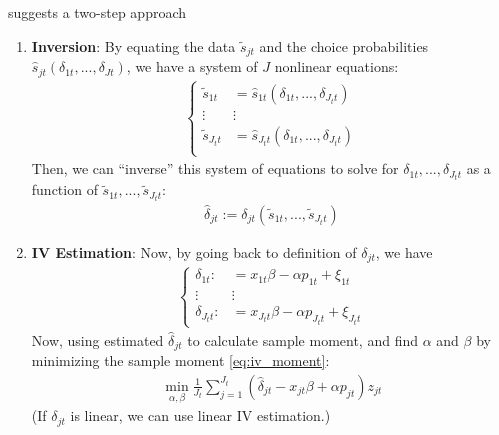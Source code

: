 \documentclass[11pt]{elegantbook}
\begin{document}
\begin{definition}
    \cite{berry1994estimating} suggests a two-step approach
    \begin{enumerate}
        \item \textbf{Inversion}: By equating the data $\tilde{s}_{jt}$ and the choice probabilities $\hat{s}_{jt}(\delta_{1t},...,\delta_{Jt})$, we have a system of $J$ nonlinear equations:
        \begin{equation}
            \begin{aligned}
                \left\{\begin{matrix}
                    \tilde{s}_{1t}&=\hat{s}_{1t}(\delta_{1t},...,\delta_{J_tt})\\
                    \vdots&\vdots\\
                    \tilde{s}_{J_tt}&=\hat{s}_{J_tt}(\delta_{1t},...,\delta_{J_tt})\\
                \end{matrix}\right.
            \end{aligned}
            \nonumber
        \end{equation}
        Then, we can ``inverse'' this system of equations to solve for $\delta_{1t},...,\delta_{J_tt}$ as a function of $\tilde{s}_{1t},...,\tilde{s}_{J_tt}$:
        \begin{equation}
            \begin{aligned}
                \hat{\delta}_{jt}:=\delta_{jt}(\tilde{s}_{1t},...,\tilde{s}_{J_tt})
            \end{aligned}
            \label{eq:inversion}
        \end{equation}
        \item \textbf{IV Estimation}: Now, by going back to definition of $\delta_{jt}$, we have
        \begin{equation}
            \begin{aligned}
                \left\{\begin{matrix}
                    \delta_{1t}:&=x_{1t}\beta-\alpha p_{1t}+\xi_{1t}\\
                    \vdots&\vdots\\
                    \delta_{J_tt}:&=x_{J_tt}\beta-\alpha p_{J_tt}+\xi_{J_tt}
                \end{matrix}\right.
            \end{aligned}
            \nonumber
        \end{equation}
        Now, using estimated $\hat{\delta}_{jt}$ to calculate sample moment, and find $\alpha$ and $\beta$ by minimizing the sample moment \eqref{eq:iv_moment}:
        \begin{equation}
            \begin{aligned}
                \min_{\alpha,\beta}\frac{1}{J_t}\sum_{j=1}^{J_t}\left(\hat{\delta}_{jt}-x_{jt}\beta+\alpha p_{jt}\right)z_{jt}
            \end{aligned}
            \nonumber
        \end{equation}
        (If $\delta_{jt}$ is linear, we can use linear IV estimation.)
    \end{enumerate}
\end{definition}
\end{document}
